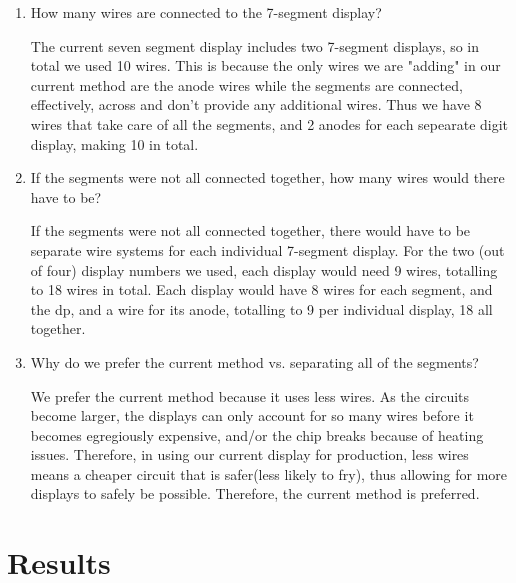 \documentclass[11pt]{article}
\begin{document}
\begin{enumerate}
	
	\item 	How many wires are connected to the 7-segment display?
	
	
	
	The current seven segment display includes two 7-segment displays, so in total we used 10 wires. This is because the only wires we are "adding" in our current method are the anode wires while the segments are connected, effectively, across and don't provide any additional wires. Thus we have 8 wires that take care of all the segments, and 2 anodes for each sepearate digit display, making 10 in total.
	
	
	
	\item   If the segments were not all connected together, how many wires would there have to be? 
	
	
	
	If the segments were not all connected together, there would have to be separate wire systems for each individual 7-segment display. For the two (out of four) display numbers we used, each display would need 9 wires, totalling to 18 wires in total. Each display would have 8 wires for each segment, and the dp, and a wire for its anode, totalling to 9 per individual display, 18 all together.
	
	
	
	\item 	Why do we prefer the current method vs. separating all of the segments?
	
	
	
	We prefer the current method because it uses less wires. As the circuits become larger, the displays can only account for so many wires before it becomes egregiously expensive, and/or the chip breaks because of heating issues. Therefore, in using our current display for production, less wires means a cheaper circuit that is safer(less likely to fry), thus allowing for more displays to safely be possible. Therefore, the current method is preferred.
	
	
	
\end{enumerate}





\section*{Results}
\end{document}
